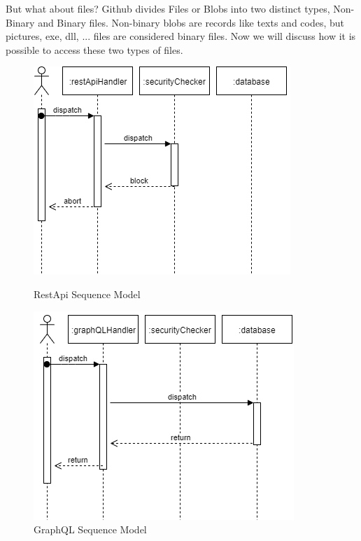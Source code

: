 \documentclass[conference]{IEEEtran}
\begin{document}
But what about files? Github divides Files or Blobs into two distinct types, Non-Binary and Binary files. Non-binary blobs are records like texts and codes, but pictures, exe, dll, ... files are considered binary files. Now we will discuss how it is possible to access these two types of files.

\begin{figure}[hbt!]
  \includegraphics[width=\linewidth]{diagram_rest.png}
  \caption{RestApi Sequence Model}
  \label{fig:diagram_rest}
  \includegraphics[width=\linewidth]{diagram_ql.png}
  \caption{GraphQL Sequence Model}
  \label{fig:diagram_ql}
\end{figure}
\end{document}
